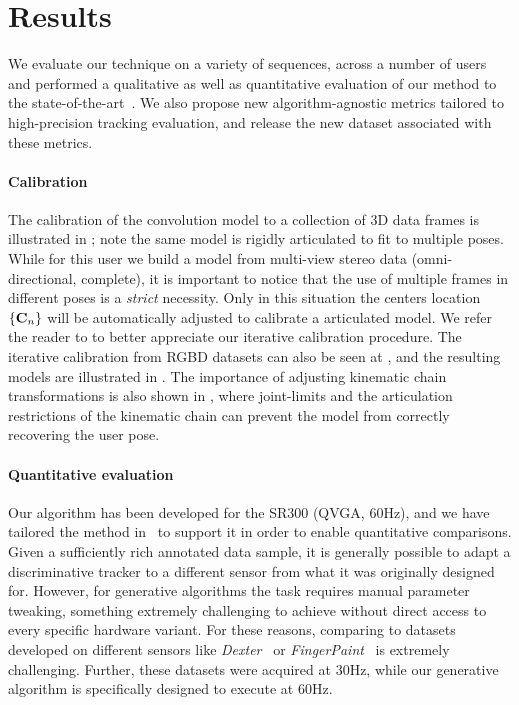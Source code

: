 \section{Results}
\label{sec:results}
We evaluate our technique on a variety of sequences, across a number of users and performed a qualitative as well as quantitative evaluation of our method to the state-of-the-art~\cite{sridhar2015fast,tagliasacchi2015robust,sharp2015accurate,taylor2016concerto}. We also propose new algorithm-agnostic metrics tailored to high-precision tracking evaluation, and release the new  dataset associated with these metrics.

\paragraph{Calibration}
The calibration of the convolution model to a collection of 3D data frames is illustrated in ; note the same model is rigidly articulated to fit to multiple poses. While for this user we build a model from multi-view stereo data (omni-directional, complete), it is important to notice that the use of multiple frames in different poses is a \emph{strict} necessity. Only in this situation the centers location ${\{\mathbf{C}_n\}}$ will be automatically adjusted to calibrate a  articulated model. We refer the reader to  to better appreciate our iterative calibration procedure. The iterative calibration from RGBD datasets can also be seen at , and the resulting models are illustrated in . The importance of adjusting kinematic chain transformations is also shown in , where joint-limits and the articulation restrictions of the kinematic chain can prevent the model from correctly recovering the user pose.

\paragraph{Quantitative evaluation}
Our algorithm has been developed for the \realsense{} SR300 (QVGA, 60Hz), and we have tailored the method in~\cite{tagliasacchi2015robust} to support it in order to enable quantitative comparisons.
% 
Given a sufficiently rich annotated data sample, it is generally possible to adapt a discriminative tracker to a different sensor from what it was originally designed for. However, for generative algorithms the task requires manual parameter tweaking, something extremely challenging to achieve without direct access to every specific hardware variant.
% 
For these reasons, comparing to datasets developed on different sensors like \emph{Dexter}~\cite{sridhar2013multicam} or \emph{FingerPaint}~\cite{sharp2015accurate} is extremely challenging. 
Further, these datasets were acquired at 30Hz, while our generative algorithm is specifically designed to execute at 60Hz.

